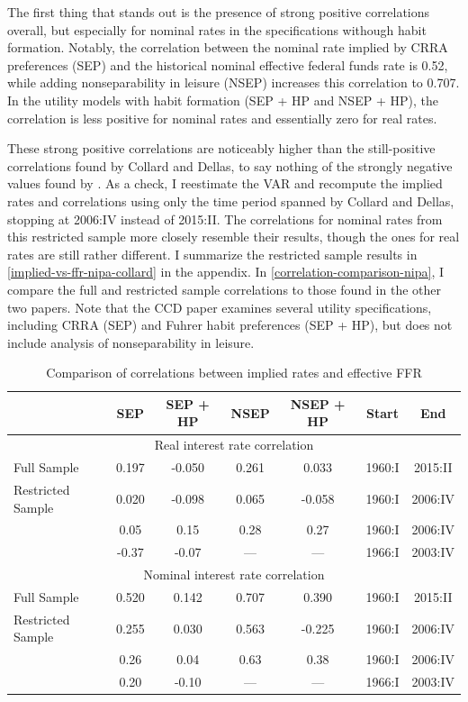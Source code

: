 The first thing that stands out is the presence of strong positive correlations overall, but especially for nominal rates in the specifications withough habit formation. Notably, the correlation between the nominal rate implied by CRRA preferences (SEP) and the historical nominal effective federal funds rate is 0.52, while adding nonseparability in leisure (NSEP) increases this correlation to 0.707. In the utility models with habit formation (SEP + HP and NSEP + HP), the correlation is less positive for nominal rates and essentially zero for real rates.

These strong positive correlations are noticeably higher than the still-positive correlations found by Collard and Dellas, to say nothing of the strongly negative values found by \cite{canzoneri07}. As a check, I reestimate the VAR and recompute the implied rates and correlations using only the time period spanned by Collard and Dellas, stopping at 2006:IV instead of 2015:II. The correlations for nominal rates from this restricted sample more closely resemble their results, though the ones for real rates are still rather different. I summarize the restricted sample results in \autoref{implied-vs-ffr-nipa-collard} in the appendix. In \autoref{correlation-comparison-nipa}, I compare the full and restricted sample correlations to those found in the other two papers. Note that the CCD paper examines several utility specifications, including CRRA (SEP) and Fuhrer habit preferences (SEP + HP), but does not include analysis of nonseparability in leisure.

\begin{table}[t]
\centering
\caption{Comparison of correlations between implied rates and effective FFR}
\label{correlation-comparison-nipa}
\begin{tabular}{lcccccc} \hline
                   & SEP   & SEP + HP & NSEP  & NSEP + HP & Start  & End \\ \hline
\multicolumn{7}{c}{Real interest rate correlation} \\ \hline
Full Sample        & 0.197 & -0.050   & 0.261 & 0.033     & 1960:I & 2015:II \\
Restricted Sample  & 0.020 & -0.098   & 0.065 & -0.058    & 1960:I & 2006:IV \\
\cite{collard11}   & 0.05  & 0.15     & 0.28  & 0.27      & 1960:I & 2006:IV \\
\cite{canzoneri07} & -0.37 & -0.07    & ---   & ---       & 1966:I & 2003:IV \\ \hline
\multicolumn{7}{c}{Nominal interest rate correlation} \\ \hline
Full Sample        & 0.520 & 0.142    & 0.707 & 0.390     & 1960:I & 2015:II \\
Restricted Sample  & 0.255 & 0.030    & 0.563 & -0.225    & 1960:I & 2006:IV \\
\cite{collard11}   & 0.26  & 0.04     & 0.63  & 0.38      & 1960:I & 2006:IV \\
\cite{canzoneri07} & 0.20  & -0.10    & ---   & ---       & 1966:I & 2003:IV \\ \hline
\end{tabular}
\end{table}

